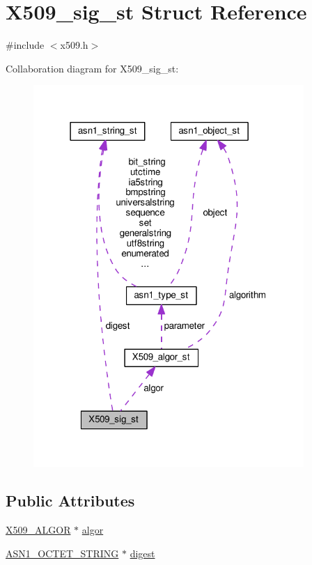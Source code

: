 \hypertarget{struct_x509__sig__st}{}\section{X509\+\_\+sig\+\_\+st Struct Reference}
\label{struct_x509__sig__st}


{\ttfamily \#include $<$x509.\+h$>$}



Collaboration diagram for X509\+\_\+sig\+\_\+st\+:
\nopagebreak
\begin{figure}[H]
\begin{center}
\leavevmode
\includegraphics[width=291pt]{struct_x509__sig__st__coll__graph}
\end{center}
\end{figure}
\subsection*{Public Attributes}
\begin{DoxyCompactItemize}
\item 
\hyperlink{ossl__typ_8h_aa2b6185e6254f36f709cd6577fb5022e}{X509\+\_\+\+A\+L\+G\+OR} $\ast$ \hyperlink{struct_x509__sig__st_a40608d2e687f0fd15132db525c18db60}{algor}
\item 
\hyperlink{ossl__typ_8h_afbd05e94e0f0430a2b729473efec88c1}{A\+S\+N1\+\_\+\+O\+C\+T\+E\+T\+\_\+\+S\+T\+R\+I\+NG} $\ast$ \hyperlink{struct_x509__sig__st_aef06b1dae888d04a2cdf2f85208d0ba2}{digest}
\end{DoxyCompactItemize}


